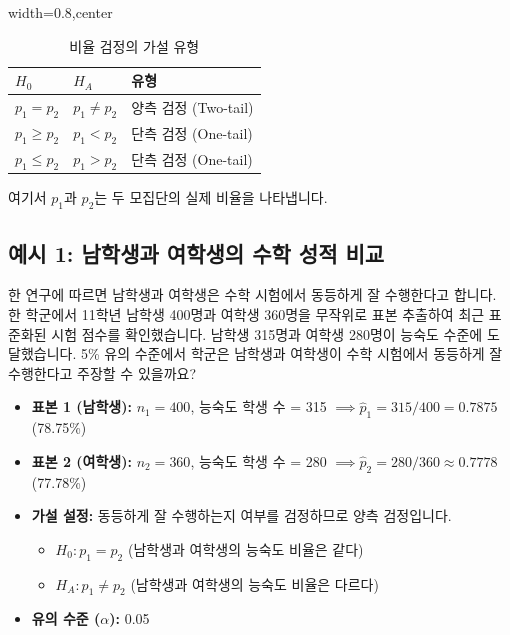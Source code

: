 \documentclass[11pt,a4paper]{book}
\theoremstyle{definition}
\begin{document}
\begin{table}[h!]
\caption{비율 검정의 가설 유형}
\label{tab:proportion_hypotheses}
\centering
\begin{adjustbox}{width=0.8\textwidth,center}
\begin{tabular}{lll}
\toprule
\textbf{$H_0$} & \textbf{$H_A$} & \textbf{유형} \\
\midrule
$p_1 = p_2$ & $p_1 \ne p_2$ & 양측 검정 (Two-tail) \\
$p_1 \ge p_2$ & $p_1 < p_2$ & 단측 검정 (One-tail) \\
$p_1 \le p_2$ & $p_1 > p_2$ & 단측 검정 (One-tail) \\
\bottomrule
\end{tabular}
\end{adjustbox}
\end{table}
여기서 $p_1$과 $p_2$는 두 모집단의 실제 비율을 나타냅니다.

\subsection{예시 1: 남학생과 여학생의 수학 성적 비교}
\begin{examplebox}[title=시나리오:]
한 연구에 따르면 남학생과 여학생은 수학 시험에서 동등하게 잘 수행한다고 합니다. 한 학군에서 11학년 남학생 400명과 여학생 360명을 무작위로 표본 추출하여 최근 표준화된 시험 점수를 확인했습니다. 남학생 315명과 여학생 280명이 능숙도 수준에 도달했습니다. 5\% 유의 수준에서 학군은 남학생과 여학생이 수학 시험에서 동등하게 잘 수행한다고 주장할 수 있을까요?
\end{examplebox}

\begin{itemize}
    \item \textbf{표본 1 (남학생):} $n_1 = 400$, 능숙도 학생 수 = 315 $\implies \hat{p}_1 = 315/400 = 0.7875$ (78.75\%)
    \item \textbf{표본 2 (여학생):} $n_2 = 360$, 능숙도 학생 수 = 280 $\implies \hat{p}_2 = 280/360 \approx 0.7778$ (77.78\%)
    \item \textbf{가설 설정:} 동등하게 잘 수행하는지 여부를 검정하므로 양측 검정입니다.
    \begin{itemize}
        \item $H_0: p_1 = p_2$ (남학생과 여학생의 능숙도 비율은 같다)
        \item $H_A: p_1 \ne p_2$ (남학생과 여학생의 능숙도 비율은 다르다)
    \end{itemize}
    \item \textbf{유의 수준 ($\alpha$):} 0.05
\end{itemize}
\end{document}
